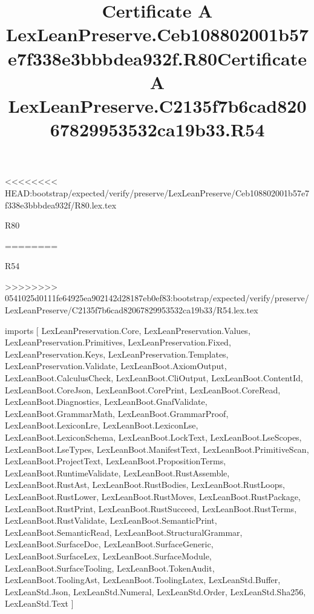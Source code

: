 <<<<<<<< HEAD:bootstrap/expected/verify/preserve/LexLeanPreserve/Ceb108802001b57e7f338e3bbbdea932f/R80.lex.tex
\begin{lexlean}{R80}
\title{Certificate A LexLeanPreserve.Ceb108802001b57e7f338e3bbbdea932f.R80}
========
\begin{lexlean}{R54}
\title{Certificate A LexLeanPreserve.C2135f7b6cad82067829953532ca19b33.R54}
>>>>>>>> 0541025d0111fe64925ea902142d28187eb0ef83:bootstrap/expected/verify/preserve/LexLeanPreserve/C2135f7b6cad82067829953532ca19b33/R54.lex.tex
\begin{coremodule}
imports [
  LexLeanPreservation.Core,
  LexLeanPreservation.Values,
  LexLeanPreservation.Primitives,
  LexLeanPreservation.Fixed,
  LexLeanPreservation.Keys,
  LexLeanPreservation.Templates,
  LexLeanPreservation.Validate,
  LexLeanBoot.AxiomOutput,
  LexLeanBoot.CalculusCheck,
  LexLeanBoot.CliOutput,
  LexLeanBoot.ContentId,
  LexLeanBoot.CoreJson,
  LexLeanBoot.CorePrint,
  LexLeanBoot.CoreRead,
  LexLeanBoot.Diagnostics,
  LexLeanBoot.GnafValidate,
  LexLeanBoot.GrammarMath,
  LexLeanBoot.GrammarProof,
  LexLeanBoot.LexiconLre,
  LexLeanBoot.LexiconLse,
  LexLeanBoot.LexiconSchema,
  LexLeanBoot.LockText,
  LexLeanBoot.LseScopes,
  LexLeanBoot.LseTypes,
  LexLeanBoot.ManifestText,
  LexLeanBoot.PrimitiveScan,
  LexLeanBoot.ProjectText,
  LexLeanBoot.PropositionTerms,
  LexLeanBoot.RuntimeValidate,
  LexLeanBoot.RustAssemble,
  LexLeanBoot.RustAst,
  LexLeanBoot.RustBodies,
  LexLeanBoot.RustLoops,
  LexLeanBoot.RustLower,
  LexLeanBoot.RustMoves,
  LexLeanBoot.RustPackage,
  LexLeanBoot.RustPrint,
  LexLeanBoot.RustSucceed,
  LexLeanBoot.RustTerms,
  LexLeanBoot.RustValidate,
  LexLeanBoot.SemanticPrint,
  LexLeanBoot.SemanticRead,
  LexLeanBoot.StructuralGrammar,
  LexLeanBoot.SurfaceDoc,
  LexLeanBoot.SurfaceGeneric,
  LexLeanBoot.SurfaceLex,
  LexLeanBoot.SurfaceModule,
  LexLeanBoot.SurfaceTooling,
  LexLeanBoot.TokenAudit,
  LexLeanBoot.ToolingAst,
  LexLeanBoot.ToolingLatex,
  LexLeanStd.Buffer,
  LexLeanStd.Json,
  LexLeanStd.Numeral,
  LexLeanStd.Order,
  LexLeanStd.Sha256,
  LexLeanStd.Text
]


\end{coremodule}
\end{lexlean}
\end{lexlean}
